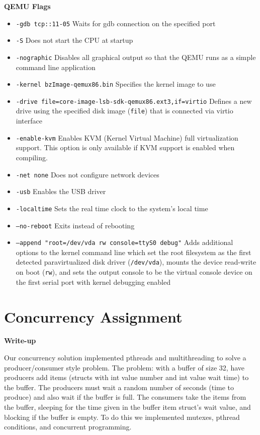 \documentclass[10pt,letterpaper,draftclsnofoot,onecolumn]{IEEEtran}
\begin{document}
\noindent\textbf{QEMU Flags}
\begin{itemize}
\item \texttt{-gdb tcp::11-05} Waits for gdb connection on the specified port
\item \texttt{-S} Does not start the CPU at startup
\item \texttt{-nographic} Disables all graphical output so that the QEMU runs as a simple command line application
\item \texttt{-kernel bzImage-qemux86.bin} Specifies the kernel image to use
\item \texttt{-drive file=core-image-lsb-sdk-qemux86.ext3,if=virtio} Defines a new drive using the specified disk image (\texttt{file}) that is connected via virtio interface 
\item \texttt{-enable-kvm} Enables KVM (Kernel Virtual Machine) full virtualization support. This option is only available if KVM support is enabled when compiling.
\item \texttt{-net none} Does not configure network devices
\item \texttt{-usb} Enables the USB driver
\item \texttt{-localtime} Sets the real time clock to the system's local time
\item \texttt{--no-reboot} Exits instead of rebooting
\item \texttt{--append "root=/dev/vda rw console=ttyS0 debug"} Adds additional options to the kernel command line which set the root filesystem as the first detected paravirtualized disk driver (\texttt{/dev/vda}), mounts the device read-write on boot (\texttt{rw}), and sets the output console to be the virtual console device on the first serial port with kernel debugging enabled
\end{itemize}\pagebreak

\section{Concurrency Assignment}
\bigskip

\noindent\textbf{Write-up}
\medskip

\medskip

\noindent Our concurrency solution implemented pthreads and multithreading to solve a producer/consumer style problem. The problem: with a buffer of size 32, have producers add items (structs with int value number and int value wait time) to the buffer. The producers must wait a random number of seconds (time to produce) and also wait if the buffer is full. The consumers take the items from the buffer, sleeping for the time given in the buffer item struct's wait value, and blocking if the buffer is empty. To do this we implemented mutexes, pthread conditions, and concurrent programming.\par
\medskip
\end{document}
